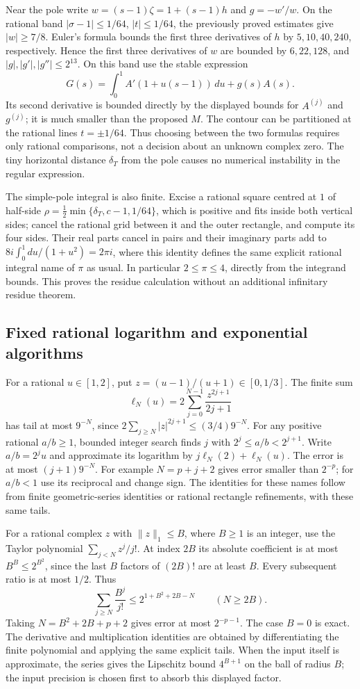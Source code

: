 Near the pole write $w=(s-1)\zeta=1+(s-1)h$ and
$g=-w'/w$. On the rational band
$|\sigma-1|\le1/64$, $|t|\le1/64$, the previously proved estimates
give $|w|\ge7/8$. Euler's formula bounds the first three derivatives
of $h$ by $5,10,40,240$, respectively. Hence the first three
derivatives of $w$ are bounded by $6,22,128$, and
$|g|,|g'|,|g''|\le2^{13}$. On this band use the stable expression
\[
 G(s)=\int_0^1 A'(1+u(s-1))\,du+g(s)A(s).
\]
Its second derivative is bounded directly by the displayed bounds for
$A^{(j)}$ and $g^{(j)}$; it is much smaller than the proposed $M$.
The contour can be partitioned at the rational lines $t=\pm1/64$.
Thus choosing between the two formulas requires only rational comparisons,
not a decision about an unknown complex zero. The tiny horizontal
distance $\delta_T$ from the pole causes no numerical instability in
the regular expression.

The simple-pole integral is also finite. Excise a rational square centred
at $1$ of half-side $\rho=\tfrac12\min\{\delta_T,c-1,1/64\}$,
which is positive and fits inside both vertical sides; cancel the rational grid between it
and the outer rectangle, and compute its four sides. Their real parts
cancel in pairs and their imaginary parts add to
$8i\int_0^1du/(1+u^2)=2\pi i$, where this identity defines the same
explicit rational integral name of $\pi$ as usual. In particular
$2\le\pi\le4$, directly from the integrand bounds. This proves the
residue calculation without an additional infinitary residue theorem.

\subsection{Fixed rational logarithm and exponential algorithms}

For a rational $u\in[1,2]$, put $z=(u-1)/(u+1)\in[0,1/3]$.
The finite sum
\[
 \ell_N(u)=2\sum_{j=0}^{N-1}\frac{z^{2j+1}}{2j+1}
\]
has tail at most $9^{-N}$, since
$2\sum_{j\ge N}|z|^{2j+1}\le(3/4)9^{-N}$.
For any positive rational $a/b\ge1$, bounded integer search finds
$j$ with $2^j\le a/b<2^{j+1}$. Write $a/b=2^ju$ and approximate
its logarithm by $j\ell_N(2)+\ell_N(u)$. The error is at most
$(j+1)9^{-N}$. For example $N=p+j+2$ gives error smaller than
$2^{-p}$; for $a/b<1$ use its reciprocal and change sign.
The identities for these names follow from finite geometric-series
identities or rational rectangle refinements, with these same tails.

For a rational complex $z$ with $\lVert z\rVert_1\le B$, where $B\ge1$ is an integer,
use the Taylor polynomial $\sum_{j<N}z^j/j!$. At index $2B$ its
absolute coefficient is at most $B^B\le2^{B^2}$, since the last $B$
factors of $(2B)!$ are at least $B$. Every subsequent ratio is at most
$1/2$. Thus
\[
 \sum_{j\ge N}\frac{B^j}{j!}
       \le2^{1+B^2+2B-N}\qquad(N\ge2B).
\]
Taking $N=B^2+2B+p+2$ gives error at most $2^{-p-1}$.
The case $B=0$ is exact. The derivative and multiplication identities
are obtained by differentiating the finite polynomial and applying the
same explicit tails. When the input itself is approximate, the series
gives the Lipschitz bound $4^{B+1}$ on the ball of radius $B$; the
input precision is chosen first to absorb this displayed factor.

